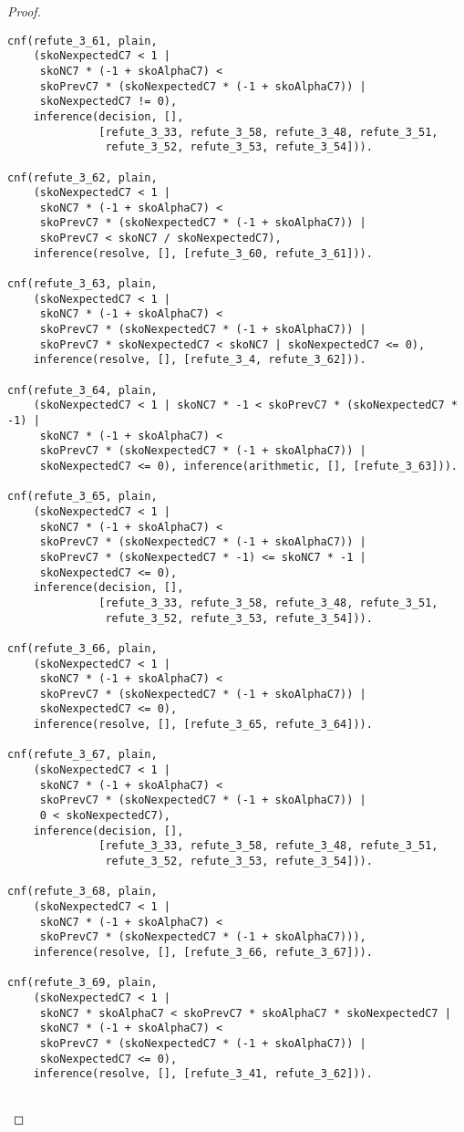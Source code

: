 \begin{proof}
\begin{verbatim}
cnf(refute_3_61, plain,
    (skoNexpectedC7 < 1 |
     skoNC7 * (-1 + skoAlphaC7) <
     skoPrevC7 * (skoNexpectedC7 * (-1 + skoAlphaC7)) |
     skoNexpectedC7 != 0),
    inference(decision, [],
              [refute_3_33, refute_3_58, refute_3_48, refute_3_51,
               refute_3_52, refute_3_53, refute_3_54])).

cnf(refute_3_62, plain,
    (skoNexpectedC7 < 1 |
     skoNC7 * (-1 + skoAlphaC7) <
     skoPrevC7 * (skoNexpectedC7 * (-1 + skoAlphaC7)) |
     skoPrevC7 < skoNC7 / skoNexpectedC7),
    inference(resolve, [], [refute_3_60, refute_3_61])).

cnf(refute_3_63, plain,
    (skoNexpectedC7 < 1 |
     skoNC7 * (-1 + skoAlphaC7) <
     skoPrevC7 * (skoNexpectedC7 * (-1 + skoAlphaC7)) |
     skoPrevC7 * skoNexpectedC7 < skoNC7 | skoNexpectedC7 <= 0),
    inference(resolve, [], [refute_3_4, refute_3_62])).

cnf(refute_3_64, plain,
    (skoNexpectedC7 < 1 | skoNC7 * -1 < skoPrevC7 * (skoNexpectedC7 * -1) |
     skoNC7 * (-1 + skoAlphaC7) <
     skoPrevC7 * (skoNexpectedC7 * (-1 + skoAlphaC7)) |
     skoNexpectedC7 <= 0), inference(arithmetic, [], [refute_3_63])).

cnf(refute_3_65, plain,
    (skoNexpectedC7 < 1 |
     skoNC7 * (-1 + skoAlphaC7) <
     skoPrevC7 * (skoNexpectedC7 * (-1 + skoAlphaC7)) |
     skoPrevC7 * (skoNexpectedC7 * -1) <= skoNC7 * -1 |
     skoNexpectedC7 <= 0),
    inference(decision, [],
              [refute_3_33, refute_3_58, refute_3_48, refute_3_51,
               refute_3_52, refute_3_53, refute_3_54])).

cnf(refute_3_66, plain,
    (skoNexpectedC7 < 1 |
     skoNC7 * (-1 + skoAlphaC7) <
     skoPrevC7 * (skoNexpectedC7 * (-1 + skoAlphaC7)) |
     skoNexpectedC7 <= 0),
    inference(resolve, [], [refute_3_65, refute_3_64])).

cnf(refute_3_67, plain,
    (skoNexpectedC7 < 1 |
     skoNC7 * (-1 + skoAlphaC7) <
     skoPrevC7 * (skoNexpectedC7 * (-1 + skoAlphaC7)) |
     0 < skoNexpectedC7),
    inference(decision, [],
              [refute_3_33, refute_3_58, refute_3_48, refute_3_51,
               refute_3_52, refute_3_53, refute_3_54])).

cnf(refute_3_68, plain,
    (skoNexpectedC7 < 1 |
     skoNC7 * (-1 + skoAlphaC7) <
     skoPrevC7 * (skoNexpectedC7 * (-1 + skoAlphaC7))),
    inference(resolve, [], [refute_3_66, refute_3_67])).

cnf(refute_3_69, plain,
    (skoNexpectedC7 < 1 |
     skoNC7 * skoAlphaC7 < skoPrevC7 * skoAlphaC7 * skoNexpectedC7 |
     skoNC7 * (-1 + skoAlphaC7) <
     skoPrevC7 * (skoNexpectedC7 * (-1 + skoAlphaC7)) |
     skoNexpectedC7 <= 0),
    inference(resolve, [], [refute_3_41, refute_3_62])).


\end{verbatim}
\end{proof}
